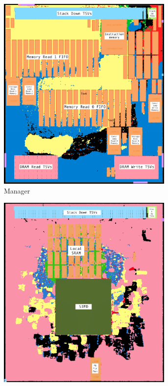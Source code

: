 \documentclass[journal]{IEEEtran}
\begin{document}
\begin{figure}
\centering
\begin{subfigure}{.25\textwidth}
  \centering
  \includegraphics[width=0.95\textwidth]{ManagerLayout.png}
  \captionsetup{justification=centering, width=.8\linewidth}
  \caption{Manager}
  \label{fig:managerLayout}
\end{subfigure}%
\begin{subfigure}{.25\textwidth}
  \centering
  \includegraphics[width=0.95\textwidth]{PElayout.png}

\end{subfigure}
\end{figure}
\end{document}
